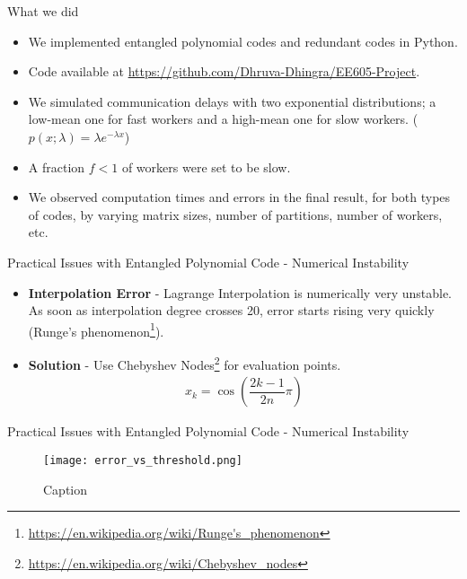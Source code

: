\documentclass{beamer}
\begin{document}
\begin{frame}{What we did}
    \begin{itemize}
        \item We implemented entangled polynomial codes and redundant codes in Python.
        \item Code available at \url{https://github.com/Dhruva-Dhingra/EE605-Project}.
        \item We simulated communication delays with two exponential distributions; a low-mean one for fast workers and a high-mean one for slow workers. ($p(x;\lambda) = \lambda e^{-\lambda x}$)
        \item A fraction $f < 1$ of workers were set to be slow.
        \item We observed computation times and errors in the final result, for both types of codes, by varying matrix sizes, number of partitions, number of workers, etc.
    \end{itemize}
\end{frame}

\begin{frame}{Practical Issues with Entangled Polynomial Code - Numerical Instability}
    \begin{itemize}
        \item \textbf{Interpolation Error} - Lagrange Interpolation is numerically very unstable. As soon as interpolation degree crosses 20, error starts rising very quickly (Runge's phenomenon\footnote{\url{https://en.wikipedia.org/wiki/Runge's_phenomenon}}).
        \item \textbf{Solution} - Use Chebyshev Nodes\footnote{\url{https://en.wikipedia.org/wiki/Chebyshev_nodes}} for evaluation points. 
        \begin{align*}
            x_k = \cos\left(\dfrac{2k-1}{2n}\pi\right)
        \end{align*}
    \end{itemize}
\end{frame}

\begin{frame}{Practical Issues with Entangled Polynomial Code - Numerical Instability}
    \begin{figure}[H]
        \centering
        \texttt{[image: error\_vs\_threshold.png]}
        \caption{Caption}
    \end{figure}
\end{frame}
\end{document}
